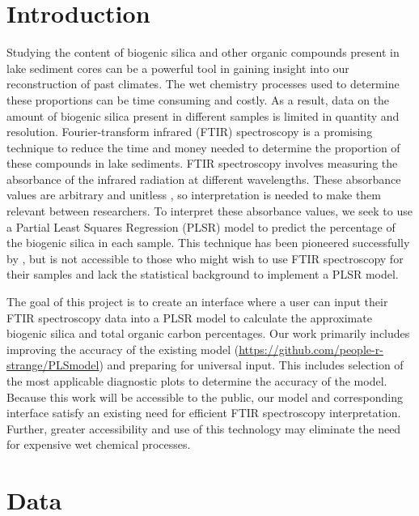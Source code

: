 \documentclass[water,article,submit,moreauthors,pdftex]{mdpi}
\begin{document}

\hypertarget{introduction}{%
\section{Introduction}\label{introduction}}

Studying the content of biogenic silica and other organic compounds
present in lake sediment cores can be a powerful tool in gaining insight
into our reconstruction of past climates. The wet chemistry processes
used to determine these proportions can be time consuming and costly. As
a result, data on the amount of biogenic silica present in different
samples is limited in quantity and resolution. Fourier-transform
infrared (FTIR) spectroscopy is a promising technique to reduce the time
and money needed to determine the proportion of these compounds in lake
sediments. FTIR spectroscopy involves measuring the absorbance of the
infrared radiation at different wavelengths. These absorbance values are
arbitrary and unitless \citet{kamat2013make}, so interpretation is
needed to make them relevant between researchers. To interpret these
absorbance values, we seek to use a Partial Least Squares Regression
(PLSR) model to predict the percentage of the biogenic silica in each
sample. This technique has been pioneered successfully by
\citet{vogel2008fourier}, but is not accessible to those who might wish
to use FTIR spectroscopy for their samples and lack the statistical
background to implement a PLSR model.

The goal of this project is to create an interface where a user can
input their FTIR spectroscopy data into a PLSR model to calculate the
approximate biogenic silica and total organic carbon percentages. Our
work primarily includes improving the accuracy of the existing model
(\url{https://github.com/people-r-strange/PLSmodel}) and preparing for
universal input. This includes selection of the most applicable
diagnostic plots to determine the accuracy of the model. Because this
work will be accessible to the public, our model and corresponding
interface satisfy an existing need for efficient FTIR spectroscopy
interpretation. Further, greater accessibility and use of this
technology may eliminate the need for expensive wet chemical processes.

\hypertarget{data}{%
\section{Data}\label{data}}
\end{document}
